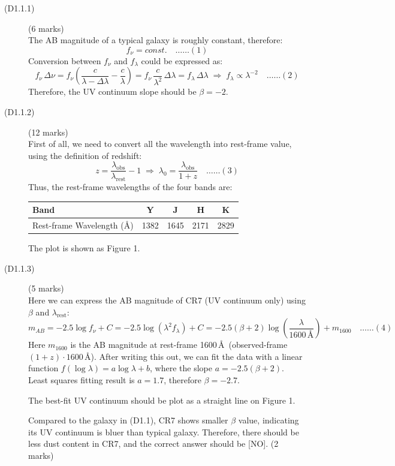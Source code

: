 \begin{description}
\item[(D1.1.1)] \hfill(6 marks)\\
  The AB magnitude of a typical galaxy is roughly constant, therefore:
  \[ f_\nu = \mathit{const.} \quad\ldots\ldots(1) \]
  Conversion between $f_\nu$ and $f_\lambda$ could be expressed as:
  \[ f_\nu\,\Delta\nu = f_\nu\left(\frac{c}{\lambda-\Delta\lambda}
     - \frac{c}{\lambda}\right)
     = f_\nu\,\frac{c}{\lambda^2}\,\Delta\lambda = f_\lambda\,\Delta\lambda
     \;\Rightarrow\; f_\lambda \propto \lambda^{-2} \quad\ldots\ldots(2) \]
  Therefore, the UV continuum slope should be $\beta = -2$.

\item[(D1.1.2)] \hfill(12 marks)\\
  First of all, we need to convert all the wavelength into rest-frame value,
  using the definition of redshift:
  \[ z = \frac{\lambda_{\mathrm{obs}}}{\lambda_{\mathrm{rest}}} - 1
     \;\Rightarrow\;
     \lambda_0 = \frac{\lambda_{\mathrm{obs}}}{1+z} \quad\ldots\ldots(3) \]
  Thus, the rest-frame wavelengths of the four bands are:

  \begin{center}
  \begin{tabular}{lcccc}
    Band & Y & J & H & K \\
    \hline
    Rest-frame Wavelength (\AA) & 1382 & 1645 & 2171 & 2829 \\
  \end{tabular}
  \end{center}

  The plot is shown as Figure 1.

\item[(D1.1.3)] \hfill(5 marks)\\
  Here we can express the AB magnitude of CR7 (UV continuum only) using
  $\beta$ and $\lambda_{\mathrm{rest}}$:
  \[ m_{AB} = -2.5\log f_\nu + C = -2.5\log(\lambda^2 f_\lambda) + C
     = -2.5(\beta+2)\log\!\left(\frac{\lambda}{1600\,\text{\AA}}\right)
       + m_{1600} \quad\ldots\ldots(4) \]
  Here $m_{1600}$ is the AB magnitude at rest-frame 1600\,\AA\
  (observed-frame $(1+z)\cdot 1600$\,\AA). After writing this out, we can fit
  the data with a linear function $f(\log\lambda) = a\log\lambda + b$, where
  the slope $a = -2.5(\beta+2)$. Least squares fitting result is $a = 1.7$,
  therefore $\beta = -2.7$.

  The best-fit UV continuum should be plot as a straight line on Figure 1.

  Compared to the galaxy in (D1.1), CR7 shows smaller $\beta$ value,
  indicating its UV continuum is bluer than typical galaxy. Therefore, there
  should be less dust content in CR7, and the correct answer should be [NO].
  \hfill(2 marks)
\end{description}

